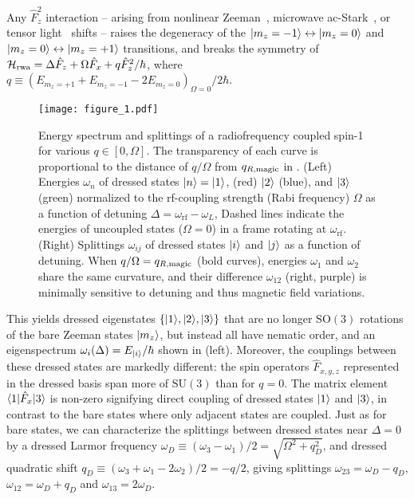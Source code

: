 \documentclass[aps,prl,reprint,superscriptaddress,floatfix]{revtex4-1}
\begin{document}
Any $\hat{F}_z^2$ interaction -- arising from nonlinear Zeeman~\cite{ramsey_molecular_1956}, microwave ac-Stark~\cite{gerbier_resonant_2006}, or tensor light~\cite{smith_continuous_2004} shifts -- raises the degeneracy of the $\vert m_z=-1 \rangle  \leftrightarrow \vert m_z=0 \rangle $ and $\vert m_z=0 \rangle  \leftrightarrow \vert m_z=+1 \rangle $ transitions, and breaks the symmetry of $\mathcal{H}_{\text{rwa}} = \Delta \hat{F}_z + \Omega \hat{F}_x + q \hat{F}_z^2/\hbar$, where $q \equiv (E_{m_z=+1} + E_{m_z=-1} - 2 E_{m_z=0})_{\Omega=0}/2\hbar$.
\begin{figure}
    \texttt{[image: figure\_1.pdf]}
    \caption{
    \label{fig:eigensystem_schematic}
        Energy spectrum and splittings of a radiofrequency coupled spin-1 for various $q \in [0,\Omega]$.
        The transparency of each curve is proportional to the distance of $q/\Omega$ from $q_{R,\text{magic}}$ in .
        (Left) Energies $\omega_n$ of dressed states $\vert n \rangle =\vert 1 \rangle $, (red) $\vert 2 \rangle $ (blue), and $\vert 3 \rangle $ (green) normalized to the rf-coupling strength (Rabi frequency) $\Omega$ as a function of detuning $\Delta=\omega_{\text{rf}}-\omega_L$,
        Dashed lines indicate the energies of uncoupled states ($\Omega=0$) in a frame rotating at $\omega_{\text{rf}}$.
        (Right) Splittings $\omega_{ij}$ of dressed states $\vert i \rangle $ and $\vert j \rangle $ as a function of detuning.
        When $q/\Omega=q_{R,\text{magic}}$ (bold curves), energies $\omega_1$ and $\omega_2$ share the same curvature, and their difference $\omega_{12}$ (right, purple) is minimally sensitive to detuning and thus magnetic field variations.
    }
\end{figure}
This yields dressed eigenstates $\{\vert 1 \rangle , \vert 2 \rangle , \vert 3 \rangle \}$ that are no longer $\text{SO}(3)$ rotations of the bare Zeeman states $\vert m_z \rangle $, but instead all have nematic order, and an eigenspectrum $\omega_i(\Delta) = E_{\vert i \rangle }/\hbar$ shown in  (left).
Moreover, the couplings between these dressed states are markedly different: the spin operators $\hat{F}_{x,y,z}$ represented in the dressed basis span more of $\text{SU}(3)$ than for $q = 0$.
The matrix element $\langle 1 \vert  \hat{F}_x \vert 3 \rangle $ is non-zero signifying direct coupling of dressed states $\vert 1 \rangle $ and $\vert 3 \rangle $, in contrast to the bare states where only adjacent states are coupled.
Just as for bare states, we can characterize the splittings between dressed states near $\Delta=0$ by a dressed Larmor frequency $\omega_D\equiv(\omega_3-\omega_1)/2=\sqrt{\Omega^2+q_D^2}$, and dressed quadratic shift $q_D \equiv (\omega_3 + \omega_1 -2\omega_2)/2=-q/2$, giving splittings $\omega_{23}=\omega_D-q_D$, $\omega_{12}=\omega_D+q_D$ and $\omega_{13}=2\omega_D$.
\end{document}
